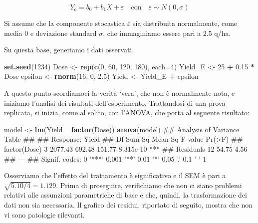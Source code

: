 \documentclass[a4paper,12pt,oneside]{book}
\newenvironment{Shaded}{\begin{snugshade}}{\end{snugshade}}
\newcommand{\KeywordTok}[1]{\textcolor[rgb]{0.13,0.29,0.53}{\textbf{#1}}}
\newcommand{\DataTypeTok}[1]{\textcolor[rgb]{0.13,0.29,0.53}{#1}}
\newcommand{\DecValTok}[1]{\textcolor[rgb]{0.00,0.00,0.81}{#1}}
\newcommand{\FloatTok}[1]{\textcolor[rgb]{0.00,0.00,0.81}{#1}}
\newcommand{\StringTok}[1]{\textcolor[rgb]{0.31,0.60,0.02}{#1}}
\newcommand{\OperatorTok}[1]{\textcolor[rgb]{0.81,0.36,0.00}{\textbf{#1}}}
\newcommand{\NormalTok}[1]{#1}
\theoremstyle{definition}
\theoremstyle{definition}
\theoremstyle{definition}
\theoremstyle{remark}
\begin{document}
\[Y_o = b_0 + b_1 X + \varepsilon \quad \textrm{con}  \quad \varepsilon \sim N(0, \sigma)\]

Si assume che la componente stocastica \(\varepsilon\) sia distribuita
normalmente, come media 0 e deviazione standard \(\sigma\), che
immaginiamo essere pari a 2.5 q/ha.

Su questa base, generiamo i dati osservati.

\begin{Shaded}
\begin{Highlighting}[]
\KeywordTok{set.seed}\NormalTok{(}\DecValTok{1234}\NormalTok{)}
\NormalTok{Dose <-}\StringTok{ }\KeywordTok{rep}\NormalTok{(}\KeywordTok{c}\NormalTok{(}\DecValTok{0}\NormalTok{, }\DecValTok{60}\NormalTok{, }\DecValTok{120}\NormalTok{, }\DecValTok{180}\NormalTok{), }\DataTypeTok{each=}\DecValTok{4}\NormalTok{) }
\NormalTok{Yield_E <-}\StringTok{ }\DecValTok{25} \OperatorTok{+}\StringTok{ }\FloatTok{0.15} \OperatorTok{*}\StringTok{ }\NormalTok{Dose}
\NormalTok{epsilon <-}\StringTok{ }\KeywordTok{rnorm}\NormalTok{(}\DecValTok{16}\NormalTok{, }\DecValTok{0}\NormalTok{, }\FloatTok{2.5}\NormalTok{)}
\NormalTok{Yield <-}\StringTok{ }\NormalTok{Yield_E }\OperatorTok{+}\StringTok{ }\NormalTok{epsilon}
\end{Highlighting}
\end{Shaded}

A questo punto scordiamoci la verità `vera', che non è normalmente nota,
e iniziamo l'analisi dei risultati dell'esperimento. Trattandosi di una
prova replicata, si inizia, come al solito, con l'ANOVA, che porta al
seguente risultato:

\begin{Shaded}
\begin{Highlighting}[]
\NormalTok{model <-}\StringTok{ }\KeywordTok{lm}\NormalTok{(Yield }\OperatorTok{~}\StringTok{ }\KeywordTok{factor}\NormalTok{(Dose))}
\KeywordTok{anova}\NormalTok{(model)}
\NormalTok{## Analysis of Variance Table}
\NormalTok{## }
\NormalTok{## Response: Yield}
\NormalTok{##              Df  Sum Sq Mean Sq F value    Pr(>F)    }
\NormalTok{## factor(Dose)  3 2077.43  692.48  151.77 8.315e-10 ***}
\NormalTok{## Residuals    12   54.75    4.56                      }
\NormalTok{## ---}
\NormalTok{## Signif. codes:  0 '***' 0.001 '**' 0.01 '*' 0.05 '.' 0.1 ' ' 1}
\end{Highlighting}
\end{Shaded}

Osserviamo che l'effetto del trattamento è significativo e il SEM è pari
a \(\sqrt{5.10/4} = 1.129\). Prima di proseguire, verifichiamo che non
ci siano problemi relativi alle assunzioni parametriche di base e che,
quindi, la trasformazione dei dati non sia necessaria. Il grafico dei
residui, riportato di seguito, mostra che non vi sono patologie
rilevanti.
\end{document}

